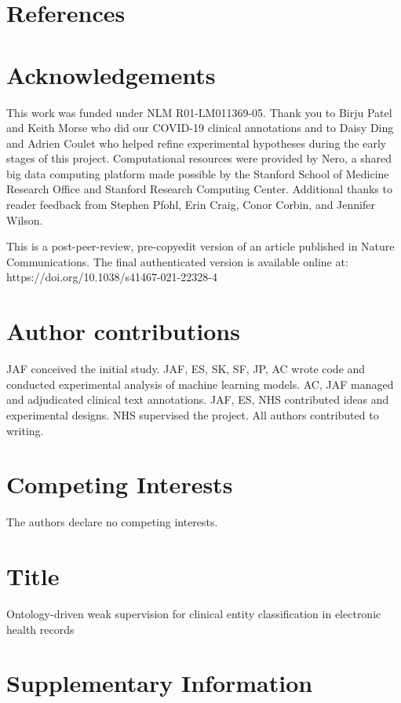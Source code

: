 \documentclass{article}
\begin{document}
\section*{References}



\section*{Acknowledgements}
This work was funded under NLM R01-LM011369-05. 
Thank you to Birju Patel and Keith Morse who did our COVID-19 clinical annotations and to Daisy Ding and Adrien Coulet who helped refine experimental hypotheses during the early stages of this project. 
Computational resources were provided by Nero, a shared big data computing platform made possible by the Stanford School of Medicine Research Office and Stanford Research Computing Center.
Additional thanks to reader feedback from Stephen Pfohl, Erin Craig, Conor Corbin, and Jennifer Wilson.

This is a post-peer-review, pre-copyedit version of an article published in Nature Communications. 
The final authenticated version is available online at: https://doi.org/10.1038/s41467-021-22328-4 


\section*{Author contributions}
JAF conceived the initial study. JAF, ES, SK, SF, JP, AC wrote code and conducted experimental analysis of machine learning models. AC, JAF managed and adjudicated clinical text annotations. JAF, ES, NHS contributed ideas and experimental designs. NHS supervised the project. All authors contributed to writing. 


\section*{Competing Interests}
The authors declare no competing interests.



\clearpage


\section*{Title}
Ontology-driven weak supervision for clinical entity classification in electronic health records



\section*{Supplementary Information}
\end{document}

